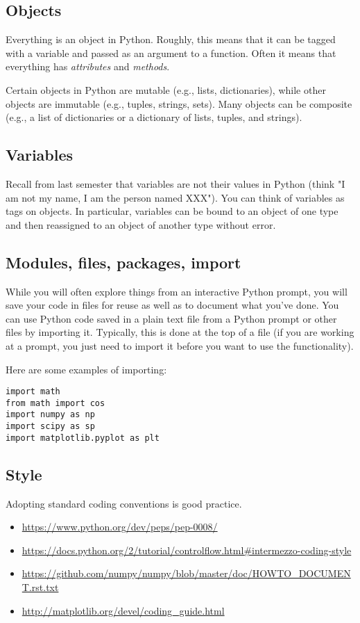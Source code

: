 \subsection{Objects}

Everything is an object in Python.  Roughly, this means that it can be tagged
with a variable and passed as an argument to a function.  Often it means that
everything has \emph{attributes} and \emph{methods}.

Certain objects in Python are mutable (e.g., lists, dictionaries), while other
objects are immutable (e.g., tuples, strings, sets). Many objects can be
composite (e.g., a list of dictionaries or a dictionary of lists, tuples, and
strings).

\subsection{Variables}

Recall from last semester that variables are not their values in
Python (think "I am not my name, I am the person named XXX"). You
can think of variables as tags on objects. In particular, variables
can be bound to an object of one type and then reassigned to an
object of another type without error.

\subsection{Modules, files, packages, import}

While you will often explore things from an interactive Python prompt,
you will save your code in files for reuse as well as to document what
you've done.  You can use Python code saved in a plain text file from
a Python prompt or other files by importing it.  Typically, this is
done at the top of a file (if you are working at a prompt, you just
need to import it before you want to use the functionality).

Here are some examples of importing:
\begin{verbatim}
import math
from math import cos
import numpy as np
import scipy as sp
import matplotlib.pyplot as plt
\end{verbatim}

\subsection{Style}

Adopting standard coding conventions is good practice.
\begin{itemize}
\item \url{https://www.python.org/dev/peps/pep-0008/}
\item \url{https://docs.python.org/2/tutorial/controlflow.html#intermezzo-coding-style}
\item \url{https://github.com/numpy/numpy/blob/master/doc/HOWTO_DOCUMENT.rst.txt}
\item \url{http://matplotlib.org/devel/coding_guide.html}
\end{itemize}


